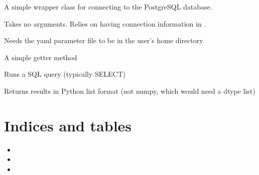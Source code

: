 \documentclass[letterpaper,10pt,english]{sphinxmanual}
\begin{document}
\begin{fulllineitems}
\label{\detokenize{db:galaxy.db.DB}}
A simple wrapper class for connecting to the PostgreSQL database.

Takes no arguments. Relies on having connection information in
.

\begin{fulllineitems}
\label{\detokenize{db:galaxy.db.DB.read_params}}
Needs the yaml parameter file to be in the user’s home directory

\end{fulllineitems}


\begin{fulllineitems}
\label{\detokenize{db:galaxy.db.DB.get_cursor}}
A simple getter method

\end{fulllineitems}


\begin{fulllineitems}
\label{\detokenize{db:galaxy.db.DB.run_query}}
Runs a SQL query (typically SELECT)

Returns results in Python list format 
(not numpy, which would need a dtype list)

\end{fulllineitems}


\end{fulllineitems}



\chapter{Indices and tables}
\label{\detokenize{index:indices-and-tables}}\begin{itemize}
\item {} 

\item {} 

\item {} 

\end{itemize}
\end{document}
